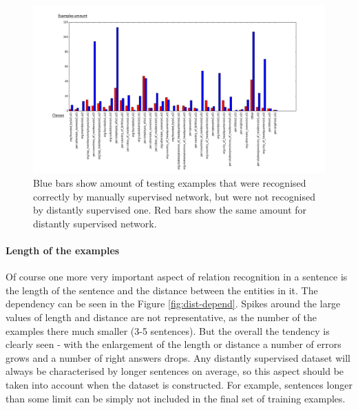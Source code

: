 \begin{figure}[H]
\centering
\includegraphics[width=\linewidth]{chapter4_experiments/images/uniq-correct.png}
\caption[Relation between correct answers for manually and distantly supervised training]{Blue bars show amount of testing examples that were recognised correctly by manually supervised network, but were not recognised by distantly supervised one. Red bars show the same amount for distantly supervised network.}
\label{fig:uniq-correct}
\end{figure}

\paragraph{Length of the examples}
\label{par:ex-length}
Of course one more very important aspect of relation recognition in a sentence is the length of the sentence and the distance
between the entities in it. The dependency can be seen in the Figure \ref{fig:dist-depend}. Spikes around the large values of length and  
distance are not representative, as the number of the examples there much smaller (3-5 sentences). But the overall the tendency 
is clearly seen - with the enlargement of the length or distance a number of errors grows and a number of right answers drops.
Any distantly supervised dataset will always be characterised by longer sentences on average, so this aspect should be taken into 
account when the dataset is constructed. For example, sentences longer than some limit can be simply not included in the 
final set of training examples.

